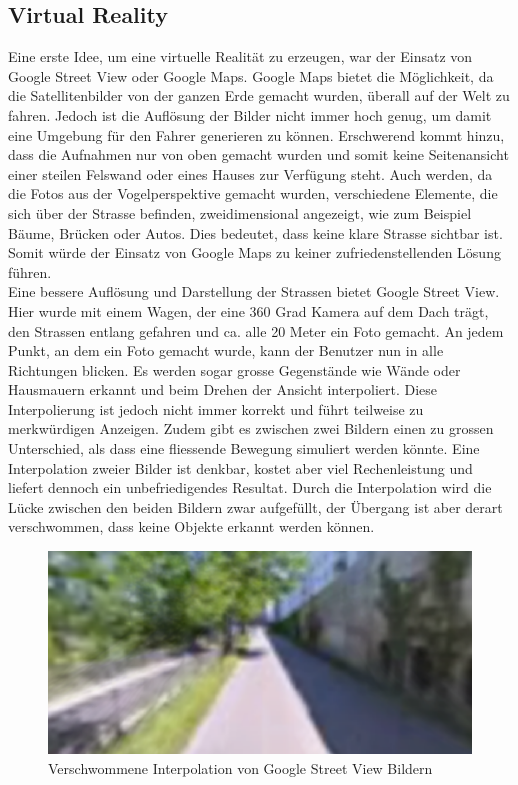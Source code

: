 \subsection{Virtual Reality}
Eine erste Idee, um eine virtuelle Realität zu erzeugen, war der Einsatz von Google Street View oder Google Maps. Google Maps bietet die Möglichkeit, da die Satellitenbilder von der ganzen Erde gemacht wurden, überall auf der Welt zu fahren. Jedoch ist die Auflösung der Bilder nicht immer hoch genug, um damit eine Umgebung für den Fahrer generieren zu können. Erschwerend kommt hinzu, dass die Aufnahmen nur von oben gemacht wurden und somit keine Seitenansicht einer steilen Felswand oder eines Hauses zur Verfügung steht. Auch werden, da die Fotos aus der Vogelperspektive gemacht wurden, verschiedene Elemente, die sich über der Strasse befinden, zweidimensional angezeigt, wie zum Beispiel Bäume, Brücken oder Autos. Dies bedeutet, dass keine klare Strasse sichtbar ist. Somit würde der Einsatz von Google Maps zu keiner zufriedenstellenden Lösung führen. \\
Eine bessere Auflösung und Darstellung der Strassen bietet Google Street View. Hier wurde mit einem Wagen, der eine 360 Grad Kamera auf dem Dach trägt, den Strassen entlang gefahren und ca. alle 20 Meter ein Foto gemacht. An jedem Punkt, an dem ein Foto gemacht wurde, kann der Benutzer nun in alle Richtungen blicken. Es werden sogar grosse Gegenstände wie Wände oder Hausmauern erkannt und beim Drehen der Ansicht interpoliert. Diese Interpolierung ist jedoch nicht immer korrekt und führt teilweise zu merkwürdigen Anzeigen. Zudem gibt es zwischen zwei Bildern einen zu grossen Unterschied, als dass eine fliessende Bewegung simuliert werden könnte. Eine Interpolation zweier Bilder ist denkbar, kostet aber viel Rechenleistung und liefert dennoch ein unbefriedigendes Resultat. Durch die Interpolation wird die Lücke zwischen den beiden Bildern zwar aufgefüllt, der Übergang ist aber derart verschwommen, dass keine Objekte erkannt werden können.
\begin{figure}[H]
\centering 
\includegraphics[width=1.0\linewidth]{src/screenshot_google_street_view_unscharf.png}
\caption{Verschwommene Interpolation von Google Street View Bildern} %
\label{screenshot_google_street_view_unscharf} %
\end{figure}
